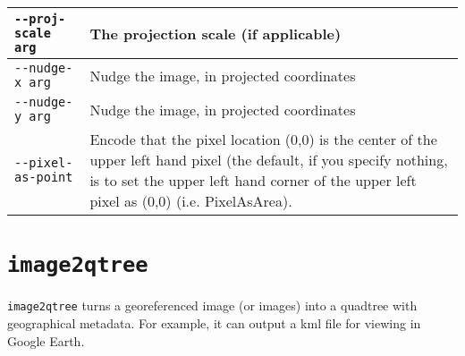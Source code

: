 \begin{longtable}{|l|p{8.5cm}|}
\verb#--proj-scale arg# & The projection scale (if applicable) \\ \hline
\verb#--nudge-x arg# & Nudge the image, in projected coordinates \\ \hline
\verb#--nudge-y arg# & Nudge the image, in projected coordinates \\ \hline
\verb#--pixel-as-point# & Encode that the pixel location (0,0) is the center of the upper left hand pixel (the default, if you specify nothing, is to set the upper left hand corner of the upper left pixel as (0,0) (i.e. PixelAsArea). \\ \hline
\end{longtable}


\section{{\tt image2qtree}}\label{sec:image2qtree}

\verb#image2qtree# turns a georeferenced image (or images) into a quadtree with geographical metadata.  For example, it can output a kml file for viewing in Google Earth.

